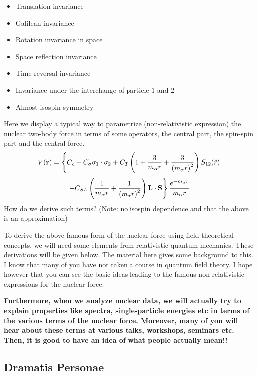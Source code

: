 \documentclass[graybox,sectrefs,envcountresetchap,open=right]{svmonodo}
\begin{document}
\begin{itemize}
\item Translation invariance

\item Galilean invariance

\item Rotation invariance in space

\item Space reflection invariance

\item Time reversal invariance

\item Invariance under the interchange of particle $1$ and $2$

\item Almost isospin symmetry
\end{itemize}

\noindent
Here we display a typical way to parametrize (non-relativistic expression) the nuclear two-body force
in terms of some operators, the central part, the spin-spin part and the central force.
\[
V(\mathbf{r})= \left\{ C_c + C_\mathbf{\sigma} \mathbf{\sigma}_1\cdot\mathbf{\sigma}_2
 + C_T \left( 1 + {3\over m_\alpha r} + {3\over\left(m_\alpha r\right)^2}\right) S_{12} (\hat r)\right. 
\]
\[
\left. + C_{SL} \left( {1\over m_\alpha r} + {1\over \left( m_\alpha r\right)^2}
\right) \mathbf{L}\cdot \mathbf{S}
\right\} \frac{e^{-m_\alpha r}}{m_\alpha r}
\]
How do we derive such terms?  (Note: no isospin dependence and that the above is an approximation)

To derive the above famous form of the nuclear force using field theoretical concepts, we will need some 
elements from relativistic quantum mechanics. These derivations will be given below. 
The material here gives some background to this.
I know that many of you have not taken a course in quantum field theory. I hope however that you can see the basic ideas leading to the famous non-relativistic expressions for the nuclear force. 

\textbf{Furthermore, when we analyze nuclear data, we will actually try to explain properties like spectra, single-particle energies etc in terms of the various terms of the nuclear force. Moreover, many of you will hear about these terms at various talks, workshops, seminars etc. Then, it is good to have an idea of what people actually mean!!}



\subsection{Dramatis Personae}
\end{document}
